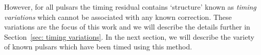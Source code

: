 However, for all pulsars the timing residual contains `structure' known as
\emph{timing variations} which cannot be associated with any known correction.
These variations are the focus of this work and we will describe the details
further in Section~\ref{sec: timing variations}.  In the next section, we will
describe the variety of known pulsars which have been timed using this method.


